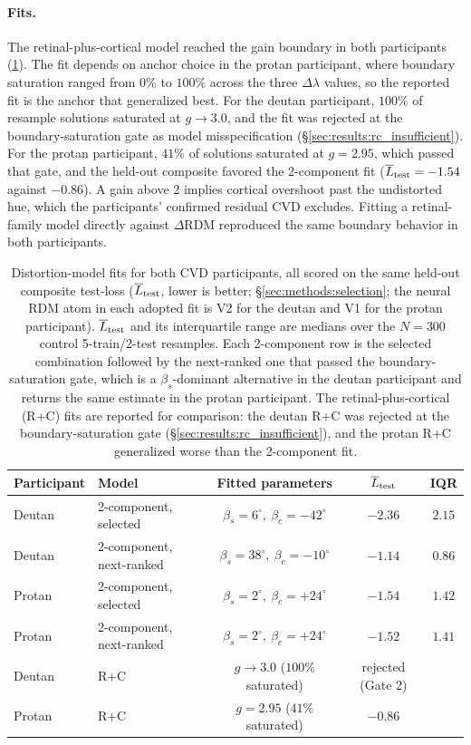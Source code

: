 \paragraph{Fits.}
The retinal-plus-cortical model reached the gain boundary in both participants (\cref{tab:modelfits}). The fit depends on anchor choice in the protan participant, where boundary saturation ranged from $0\%$ to $100\%$ across the three $\Delta\lambda$ values, so the reported fit is the anchor that generalized best. For the deutan participant, $100\%$ of resample solutions saturated at $g \to 3.0$, and the fit was rejected at the boundary-saturation gate as model misspecification (\S\ref{sec:results:rc_insufficient}). For the protan participant, $41\%$ of solutions saturated at $g = 2.95$, which passed that gate, and the held-out composite favored the 2-component fit ($\overline{L}_{\rm test} = -1.54$ against $-0.86$). A gain above 2 implies cortical overshoot past the undistorted hue, which the participants' confirmed residual CVD excludes. Fitting a retinal-family model directly against $\Delta$RDM reproduced the same boundary behavior in both participants.
\begin{table}[ht]
  \caption{Distortion-model fits for both CVD participants, all scored on the same held-out composite test-loss ($\overline{L}_{\rm test}$, lower is better; \S\ref{sec:methods:selection}; the neural RDM atom in each adopted fit is V2 for the deutan and V1 for the protan participant). $\overline{L}_{\rm test}$ and its interquartile range are medians over the $N = 300$ control 5-train/2-test resamples. Each 2-component row is the selected combination followed by the next-ranked one that passed the boundary-saturation gate, which is a $\beta_s$-dominant alternative in the deutan participant and returns the same estimate in the protan participant. The retinal-plus-cortical (R+C) fits are reported for comparison: the deutan R+C was rejected at the boundary-saturation gate (\S\ref{sec:results:rc_insufficient}), and the protan R+C generalized worse than the 2-component fit.}
  \label{tab:modelfits}
  \centering
  \small
  \begin{tabular}{llccc}
    \toprule Participant & Model & Fitted parameters & $\overline{L}_{\rm test}$ & IQR \\ \midrule
    Deutan & 2-component, selected & $\beta_s = 6^\circ,\ \beta_c = -42^\circ$ & $-2.36$ & $2.15$ \\
    Deutan & 2-component, next-ranked & $\beta_s = 38^\circ,\ \beta_c = -10^\circ$ & $-1.14$ & $0.86$ \\
    Protan & 2-component, selected & $\beta_s = 2^\circ,\ \beta_c = +24^\circ$ & $-1.54$ & $1.42$ \\
    Protan & 2-component, next-ranked & $\beta_s = 2^\circ,\ \beta_c = +24^\circ$ & $-1.52$ & $1.41$ \\ \midrule
    Deutan & R+C & $g \to 3.0$ ($100\%$ saturated) & rejected (Gate 2) & \\
    Protan & R+C & $g = 2.95$ ($41\%$ saturated) & $-0.86$ & \\ \bottomrule
  \end{tabular}
\end{table}



